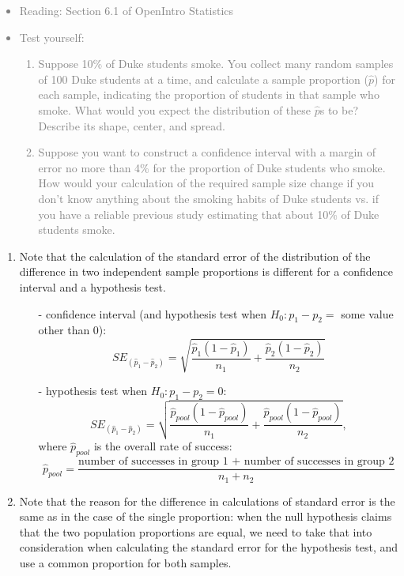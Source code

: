 \documentclass[11pt]{article}
\newcommand{\gray}[1]{\textcolor{gray}{#1}}
\begin{document}
\gray{
{\it
\vspace{-0.55cm}
\begin{itemize}
\renewcommand{\labelitemi}{{\textcolor{dark}{$\ast$}}}
\item Reading: Section 6.1 of OpenIntro Statistics
\item Test yourself:
\begin{enumerate}
\item Suppose 10\% of Duke students smoke. You collect many random samples of 100 Duke students at a time, and calculate a sample proportion ($\hat{p}$) for each sample, indicating the proportion of students in that sample who smoke. What would you expect the distribution of these $\hat{p}$s to be? Describe its shape, center, and spread.
\item Suppose you want to construct a confidence interval with a margin of error no more than 4\% for the proportion of Duke students who smoke. How would your calculation of the required sample size change if you don't know anything about the smoking habits of Duke students vs. if you have a reliable previous study estimating that about 10\% of Duke students smoke.
\end{enumerate}
\end{itemize}
}}

%

\vspace{0.48cm}

%
\begin{enumerate}[resume]
\renewcommand\labelenumi{\textcolor{light}{\textbf{LO \theenumi.}}}

\item Note that the calculation of the standard error of the distribution of the difference in two independent sample proportions is different for a confidence interval and a hypothesis test.
\begin{itemize}
\item[-] confidence interval (and hypothesis test when $H_0: p_1 -p_2 =$ some value other than 0): 
\[SE_{(\hat{p}_1 - \hat{p}_2)} = \sqrt{\frac{ \hat{p}_1 (1 - \hat{p}_1)}{n_1} + \frac{ \hat{p}_2 (1 - \hat{p}_2)}{n_2} } \]
\item[-] hypothesis test when $H_0: p_1 -p_2 = 0$: 
\[SE_{(\hat{p}_1 - \hat{p}_2)} = \sqrt{\frac{ \hat{p}_{pool} (1 - \hat{p}_{pool})}{n_1} + \frac{ \hat{p}_{pool} (1 - \hat{p}_{pool})}{n_2} }, \]
where $\hat{p}_{pool}$ is the overall rate of success:
\[ \hat{p}_{pool} = \frac{\text{number of successes in group 1 + number of successes in group 2}}{n_1 + n_2} \]
\end{itemize}

\item Note that the reason for the difference in calculations of standard error is the same as in the case of the single proportion: when the null hypothesis claims that the two population proportions are equal, we need to take that into consideration when calculating the standard error for the hypothesis test, and use a common proportion for both samples.

\end{enumerate}
\end{document}
